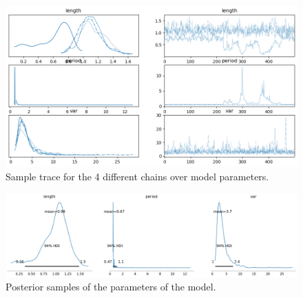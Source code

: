 \begin{figure}[htbp]
  \centering
  \includegraphics[width=1\textwidth]{./figures/nuts_trace.png}
  \caption{
    Sample trace for the 4 different chains over model parameters.
  }
  \label{gp:nuts:trace}
\end{figure}
\begin{figure}[htbp]
  \centering
  \includegraphics[width=1\textwidth]{./figures/nuts_post.png}
  \caption{
    Posterior samples of the parameters of the model.
  }
  \label{gp:nuts:post}
\end{figure}

